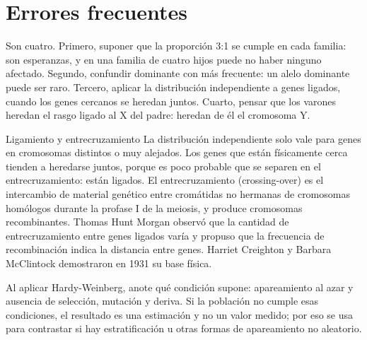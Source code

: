 \documentclass{book}
\begin{document}

\section{Errores frecuentes}

Son cuatro. Primero, suponer que la proporción 3:1 se cumple en cada familia: son esperanzas, y en una familia de cuatro hijos puede no haber ninguno afectado. Segundo, confundir dominante con más frecuente: un alelo dominante puede ser raro. Tercero, aplicar la distribución independiente a genes ligados, cuando los genes cercanos se heredan juntos. Cuarto, pensar que los varones heredan el rasgo ligado al X del padre: heredan de él el cromosoma Y.


\begin{tcolorbox}[title={Consejo}, studiumtip, breakable]

Ligamiento y entrecruzamiento
La distribución independiente solo vale para genes en cromosomas distintos o muy alejados. Los genes que están físicamente cerca tienden a heredarse juntos, porque es poco probable que se separen en el entrecruzamiento: están ligados. El entrecruzamiento (crossing-over) es el intercambio de material genético entre cromátidas no hermanas de cromosomas homólogos durante la profase I de la meiosis, y produce cromosomas recombinantes. Thomas Hunt Morgan observó que la cantidad de entrecruzamiento entre genes ligados varía y propuso que la frecuencia de recombinación indica la distancia entre genes. Harriet Creighton y Barbara McClintock demostraron en 1931 su base física.


Al aplicar Hardy-Weinberg, anote qué condición supone: apareamiento al azar y ausencia de selección, mutación y deriva. Si la población no cumple esas condiciones, el resultado es una estimación y no un valor medido; por eso se usa para contrastar si hay estratificación u otras formas de apareamiento no aleatorio.

\end{tcolorbox}
\end{document}
